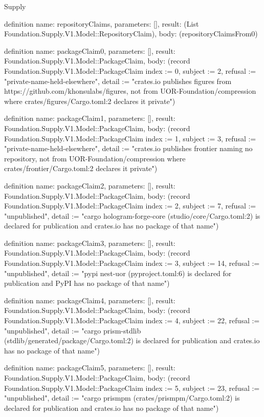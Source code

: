 \begin{lexlean}{Supply}
\begin{semanticmodule}
definition{
  name: repositoryClaims,
  parameters: [],
  result: (List Foundation.Supply.V1.Model::RepositoryClaim),
  body: (repositoryClaimsFrom0)
}

definition{
  name: packageClaim0,
  parameters: [],
  result: Foundation.Supply.V1.Model::PackageClaim,
  body: (record Foundation.Supply.V1.Model::PackageClaim {index := 0, subject := 2, refusal := "private-name-held-elsewhere", detail := "crates.io publishes figures from https://github.com/khonsulabs/figures, not from UOR-Foundation/compression where crates/figures/Cargo.toml:2 declares it private"})
}

definition{
  name: packageClaim1,
  parameters: [],
  result: Foundation.Supply.V1.Model::PackageClaim,
  body: (record Foundation.Supply.V1.Model::PackageClaim {index := 1, subject := 3, refusal := "private-name-held-elsewhere", detail := "crates.io publishes frontier naming no repository, not from UOR-Foundation/compression where crates/frontier/Cargo.toml:2 declares it private"})
}

definition{
  name: packageClaim2,
  parameters: [],
  result: Foundation.Supply.V1.Model::PackageClaim,
  body: (record Foundation.Supply.V1.Model::PackageClaim {index := 2, subject := 7, refusal := "unpublished", detail := "cargo hologram-forge-core (studio/core/Cargo.toml:2) is declared for publication and crates.io has no package of that name"})
}

definition{
  name: packageClaim3,
  parameters: [],
  result: Foundation.Supply.V1.Model::PackageClaim,
  body: (record Foundation.Supply.V1.Model::PackageClaim {index := 3, subject := 14, refusal := "unpublished", detail := "pypi nest-uor (pyproject.toml:6) is declared for publication and PyPI has no package of that name"})
}

definition{
  name: packageClaim4,
  parameters: [],
  result: Foundation.Supply.V1.Model::PackageClaim,
  body: (record Foundation.Supply.V1.Model::PackageClaim {index := 4, subject := 22, refusal := "unpublished", detail := "cargo prism-stdlib (stdlib/generated/package/Cargo.toml:2) is declared for publication and crates.io has no package of that name"})
}

definition{
  name: packageClaim5,
  parameters: [],
  result: Foundation.Supply.V1.Model::PackageClaim,
  body: (record Foundation.Supply.V1.Model::PackageClaim {index := 5, subject := 23, refusal := "unpublished", detail := "cargo prismpm (crates/prismpm/Cargo.toml:2) is declared for publication and crates.io has no package of that name"})
}


\end{semanticmodule}
\end{lexlean}
